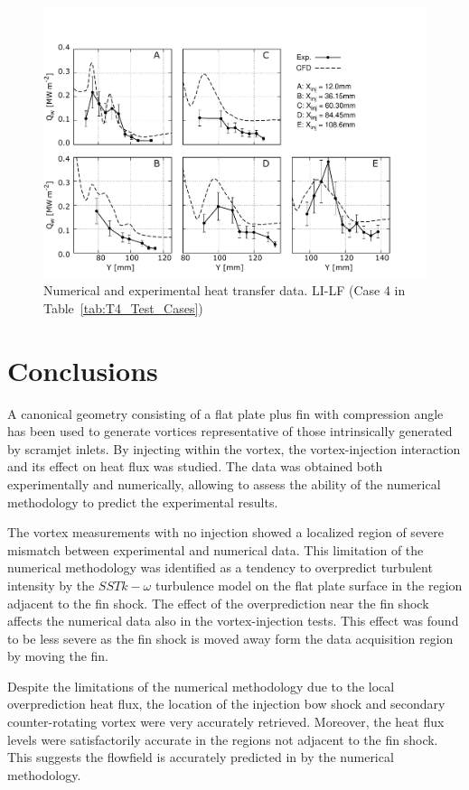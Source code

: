 \documentclass{AIAA}
\begin{document}
%
\begin{figure}[!h]
\center
\includegraphics[trim = 0mm 3mm 25mm 25mm, clip, width=0.60\columnwidth,valign=t,fbox]{Figures/Data/LP_LI_LF/GNUP_CFD_GaugesLines_Multi.pdf}
\caption{Numerical and experimental heat transfer data. LI-LF (Case 4 in Table~\ref{tab:T4_Test_Cases})}
\label{fig:HeatFluxLPLILF}
\end{figure} 


\section{Conclusions}

A canonical geometry consisting of a flat plate plus fin with compression angle has been used to generate vortices representative of those intrinsically generated by scramjet inlets. By injecting within the vortex, the vortex-injection interaction and its effect on heat flux was studied. The data was obtained both experimentally and numerically, allowing to assess the ability of the numerical methodology to predict the experimental results.

The vortex measurements with no injection showed a localized region of severe mismatch between experimental and numerical data. This limitation of the numerical methodology was identified as a tendency to overpredict turbulent intensity by the $SST k-\omega$ turbulence model on the flat plate surface in the region adjacent to the fin shock. The effect of the overprediction near the fin shock affects the numerical data also in the vortex-injection tests. This effect was found to be less severe as the fin shock is moved away form the data acquisition region by moving the fin.

Despite the limitations of the numerical methodology due to the local overprediction heat flux, the location of the injection bow shock and secondary counter-rotating vortex were very accurately retrieved. Moreover, the heat flux levels were satisfactorily accurate in the regions not adjacent to the fin shock. This suggests the flowfield is accurately predicted in by the numerical methodology.
\end{document}
